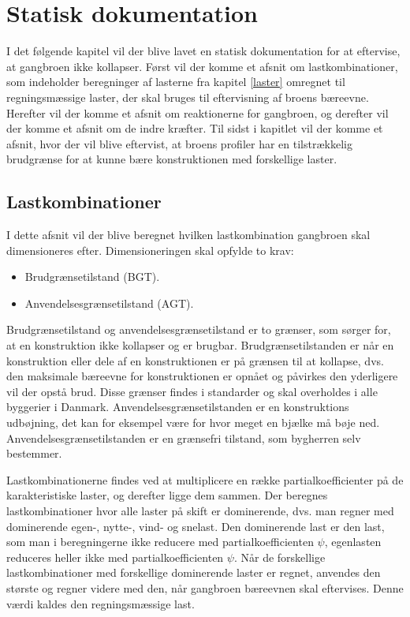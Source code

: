 \chapter{Statisk dokumentation}
I det følgende kapitel vil der blive lavet en statisk dokumentation for at eftervise, at gangbroen ikke kollapser.  Først vil der komme et afsnit om lastkombinationer, som indeholder beregninger af lasterne fra kapitel \ref{laster} omregnet til regningsmæssige laster, der skal bruges til eftervisning af broens bæreevne. Herefter vil der komme et afsnit om reaktionerne for gangbroen, og derefter vil der komme et afsnit om de indre kræfter. Til sidst i kapitlet vil der komme et afsnit, hvor der vil blive eftervist, at broens profiler har en tilstrækkelig brudgrænse for at kunne bære konstruktionen med forskellige laster.


\section{Lastkombinationer} \label{Lastkombinationer}
I dette afsnit vil der blive beregnet hvilken lastkombination gangbroen skal dimensioneres efter. Dimensioneringen skal opfylde to krav:
\begin{itemize}
\item Brudgrænsetilstand (BGT).
\item Anvendelsesgrænsetilstand (AGT).
\end{itemize}

Brudgrænsetilstand og anvendelsesgrænsetilstand er to grænser, som sørger for, at en konstruktion ikke kollapser og er brugbar. Brudgrænsetilstanden er når en konstruktion eller dele af en konstruktionen er på grænsen til at kollapse, dvs. den maksimale bæreevne for konstruktionen er opnået og påvirkes den yderligere vil der opstå brud. Disse grænser findes i standarder og  skal overholdes i alle byggerier i Danmark.  Anvendelsesgrænsetilstanden er en konstruktions udbøjning, det kan for eksempel være for hvor meget en bjælke må bøje ned. Anvendelsesgrænsetilstanden er en grænsefri tilstand, som bygherren selv bestemmer. 

Lastkombinationerne findes ved at multiplicere en række partialkoefficienter på de karakteristiske laster, og derefter ligge dem sammen. Der beregnes lastkombinationer hvor alle laster på skift er dominerende, dvs. man regner med dominerende egen-, nytte-, vind- og snelast. Den dominerende last er den last, som man i beregningerne ikke reducere med partialkoefficienten $ \psi $, egenlasten reduceres heller ikke med partialkoefficienten $ \psi $. Når de forskellige lastkombinationer med forskellige dominerende laster er regnet, anvendes den største og regner videre med den, når gangbroen bæreevnen skal eftervises. Denne værdi kaldes den regningsmæssige last.

